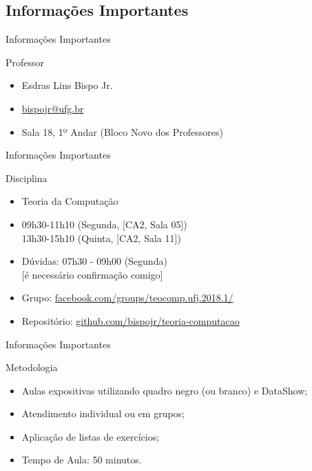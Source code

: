 \documentclass[xcolor=dvipsnames,table]{beamer}
\begin{document}
	\subsection{Informações Importantes}
	\begin{frame}{Informações Importantes}
		\begin{block}{Professor}
			\begin{itemize}
				\item Esdras Lins Bispo Jr.
				\item \url{bispojr@ufg.br}
				\item Sala 18, 1º Andar (Bloco Novo dos Professores)
			\end{itemize}
		\end{block}
	\end{frame}	
	
	\begin{frame}{Informações Importantes}
		\begin{block}{Disciplina}
			\begin{itemize}
				\item Teoria da Computação
				\item 09h30-11h10 (Segunda, [CA2, Sala 05])\\
					  13h30-15h10 (Quinta, [CA2, Sala 11])
				\item Dúvidas: 07h30 - 09h00 (Segunda)\\
					  {\color{red}[é necessário confirmação comigo]}
				\item Grupo: \url{facebook.com/groups/teocomp.ufj.2018.1/}
				\item Repositório: \url{github.com/bispojr/teoria-computacao}
			\end{itemize}
		\end{block}
	\end{frame}
	
	\begin{frame}{Informações Importantes}
		\begin{block}{Metodologia}
			\begin{itemize}
				\item Aulas expositivas utilizando quadro negro (ou branco) e DataShow;
				\item Atendimento individual ou em grupos;
				\item Aplicação de listas de exercícios;
				\item Tempo de Aula: 50 minutos.
			\end{itemize}
		\end{block}
	\end{frame}
	
\end{document}
